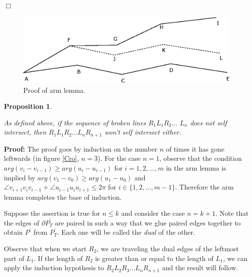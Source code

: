 \documentclass[openright, 12pt]{article}
\newtheorem{prop}[teorema]{Proposition}
\begin{document}
\hfill $\Box$


\begin{figure}[h]
\centering
{}
\includegraphics[scale=0.95]{arms.eps}
\caption{Proof of arm lemma.}
\end{figure}





\begin{prop}\label{Zig}
{\rm As defined above, if the sequence of broken lines $R_1L_1R_2\ldots$ 
$ L_n$ does not self intersect, then $R_1L_1 R_2 \ldots L_nR_{n+1}$ won't self intersect either.  

}
\end{prop}




\textbf{Proof: }The proof goes by induction on the number $n$ of times it has gone leftwards (in figure \ref{Cro}, $n=3$). For the case $n=1$, observe that the condition $arg (v_{i} - v_{i-1} )\geq arg (u_{i} - u_{i-1})$ for $i =1, 2, \ldots, m$ in the arm lemma is implied by $arg (v_1 - v_0 )\geq arg (u_1 - u_0)$ and $\angle v_{i+1}v_iv_{i-1}+ \angle u_{i-1}u_iu_{i+1} \leq 2\pi$ for $i\in \{ 1,2, \ldots, m-1\}$. Therefore the arm lemma completes the base of induction.

Suppose the assertion is true for $n \leq k$ and consider the case $n=k+1$.  Note that the edges of $\partial P^{\prime}_T$ are paired in such a way that we glue paired edges together to obtain $P^{\prime}$ from $P ^{\prime}_T$. Each one will be called the \textit{dual} of the other.

Observe that when we start $R_2$, we are traveling the dual edges of the leftmost part of $L_1$. If the length of $R_2$ is greater than or equal to the length of $L_1$, we can apply the induction hypothesis to $R_2L_2R_3 \ldots L_nR_{n+1}$ and the result will follow. 
\end{document}
